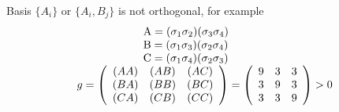 \documentclass[a4paper]{jpconf}
\renewcommand\[{\begin{equation}}
\renewcommand\]{\end{equation}}
\begin{document}
Basis $\{A_i\}$ or $\{A_i,B_j\}$ is not orthogonal, for example
\[\begin{array}{l}
\qquad \qquad \quad {\rm{A = (}}{{\bf{\sigma }}_1}{{\bf{\sigma }}_2}{\rm{)(}}{{\bf{\sigma }}_3}{{\bf{\sigma }}_4}{\rm{)}}\\
\qquad \qquad \quad {\rm{B = (}}{{\bf{\sigma }}_1}{{\bf{\sigma }}_3}{\rm{)(}}{{\bf{\sigma }}_2}{{\bf{\sigma }}_4}{\rm{)}}\\
\qquad \qquad \quad {\rm{C = (}}{{\bf{\sigma }}_1}{{\bf{\sigma }}_4}{\rm{)(}}{{\bf{\sigma }}_2}{{\bf{\sigma }}_3}{\rm{)}}\\
g = \left( {\begin{array}{*{20}{c}}
	{(AA)}&{(AB)}&{(AC)}\\
	{(BA)}&{(BB)}&{(BC)}\\
	{(CA)}&{(CB)}&{(CC)}
	\end{array}} \right) = \left( {\begin{array}{*{20}{c}}
	9&3&3\\
	3&9&3\\
	3&3&9
	\end{array}} \right) > 0
\end{array}\]
\end{document}
